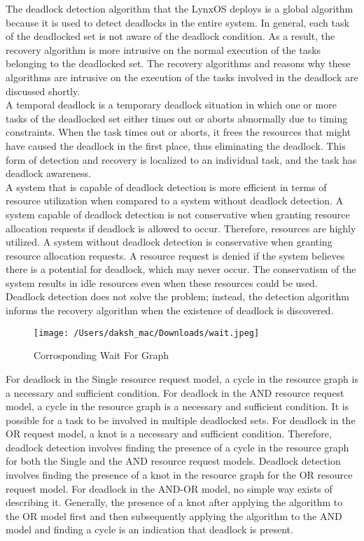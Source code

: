 \documentclass[12pt]{article}
\begin{document}
The deadlock detection algorithm that the LynxOS deploys is a global algorithm because it is used to detect deadlocks in the entire system. In general, each task of the deadlocked set is not aware of the deadlock condition. As a result, the recovery algorithm is more intrusive on the normal execution of the tasks belonging to the deadlocked set. The recovery algorithms and reasons why these algorithms are intrusive on the execution of the tasks involved in the deadlock are discussed shortly.\\
A temporal deadlock is a temporary deadlock situation in which one or more tasks of the deadlocked set either times out or aborts abnormally due to timing constraints. When the task times out or aborts, it frees the resources that might have caused the deadlock in the first place, thus eliminating the deadlock. This form of detection and recovery is localized to an individual task, and the task has deadlock awareness.\\
A system that is capable of deadlock detection is more efficient in terms of resource utilization when compared to a system without deadlock detection. A system capable of deadlock detection is not conservative when granting resource allocation requests if deadlock is allowed to occur. Therefore, resources are highly utilized. A system without deadlock detection is conservative when granting resource allocation requests. A resource request is denied if the system believes there is a potential for deadlock, which may never occur. The conservatism of the system results in idle resources even when these resources could be used.\\
Deadlock detection does not solve the problem; instead, the detection algorithm informs the recovery algorithm when the existence of deadlock is discovered.

\begin{figure}[H]
	\centering
	\texttt{[image: /Users/daksh\_mac/Downloads/wait.jpeg]}
	\caption[About deadlock]{Corrosponding Wait For Graph}
	\label{fig:wait}	
\end{figure}

For deadlock in the Single resource request model, a cycle in the resource graph is a necessary and sufficient condition.
For deadlock in the AND resource request model, a cycle in the resource graph is a necessary and sufficient condition. It is possible for a task to be involved in multiple deadlocked sets.
For deadlock in the OR request model, a knot is a necessary and sufficient condition.
Therefore, deadlock detection involves finding the presence of a cycle in the resource graph for both the Single and the AND resource request models. Deadlock detection involves finding the presence of a knot in the resource graph for the OR resource request model.
For deadlock in the AND-OR model, no simple way exists of describing it. Generally, the presence of a knot after applying the algorithm to the OR model first and then subsequently applying the algorithm to the AND model and finding a cycle is an indication that deadlock is present.
\end{document}
